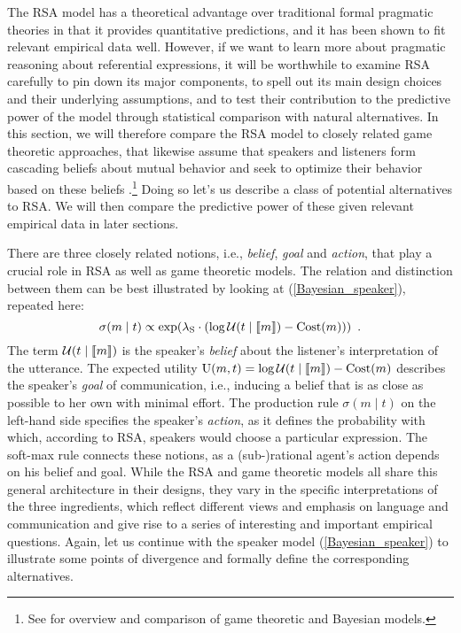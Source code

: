 The RSA model has a theoretical advantage over traditional formal
pragmatic theories in that it provides quantitative predictions, and
it has been shown to fit relevant empirical data well. However, if we
want to learn more about pragmatic reasoning about referential
expressions, it will be worthwhile to examine RSA carefully to pin
down its major components, to spell out its main design choices and
their underlying assumptions, and to test their contribution to the
predictive power of the model through statistical comparison with
natural alternatives. In this section, we will therefore compare the
RSA model to closely related game theoretic approaches, that likewise
assume that speakers and listeners form cascading beliefs about mutual behavior
and seek to optimize their behavior based on these beliefs
\cite{Rabin1990:Communication-b,Stalnaker:SayingMeaningCredibility,BenzvanRooijOptimalAssertions2007,Franke2011:Quantity-Implic,Jager2013:Rationalizable-}.\footnote{See
\cite{FrankeJager2013:Pragmatic-Back-} for overview and comparison
of game theoretic and Bayesian models.} Doing so
let's us describe a class of potential alternatives to RSA. We will
then compare the predictive power of these given relevant empirical
data in later sections.

There are three closely related notions, i.e., \emph{belief},
\emph{goal} and \emph{action}, that play a crucial role in RSA as well
as game theoretic models. The relation and distinction between them
can be best illustrated by looking at (\ref{Bayesian_speaker}),
repeated here:
$$\sigma(m \mid t) \propto \exp(\lambda_\mathrm{S} \cdot (\log \mathcal{U}(t\mid \llbracket m \rrbracket)-\mbox{Cost}(m))) \enspace .$$
The term $\mathcal{U}(t\mid \llbracket m \rrbracket)$ is the speaker's \emph{belief}
about the listener's interpretation of the utterance. The expected
utility $\mbox{U}(m,t)=\log \mathcal{U}(t\mid
\llbracket m \rrbracket)-\mbox{Cost}(m)$ describes the speaker's \emph{goal} of
communication, i.e., inducing a belief that is as close as possible to
her own with minimal effort. The production rule $\sigma(m \mid t)$ on
the left-hand side specifies the speaker's \emph{action}, as it
defines the probability with which, according to RSA, speakers would
choose a particular expression. The soft-max rule connects these
notions, as a (sub-)rational agent's action depends on his belief and
goal. While the RSA and game theoretic models all share this general
architecture in their designs, they vary in the specific
interpretations of the three ingredients, which reflect different
views and emphasis on language and communication and give rise to a
series of interesting and important empirical questions. Again, let us
continue with the speaker model (\ref{Bayesian_speaker}) to illustrate
some points of divergence and formally define the corresponding
alternatives.

